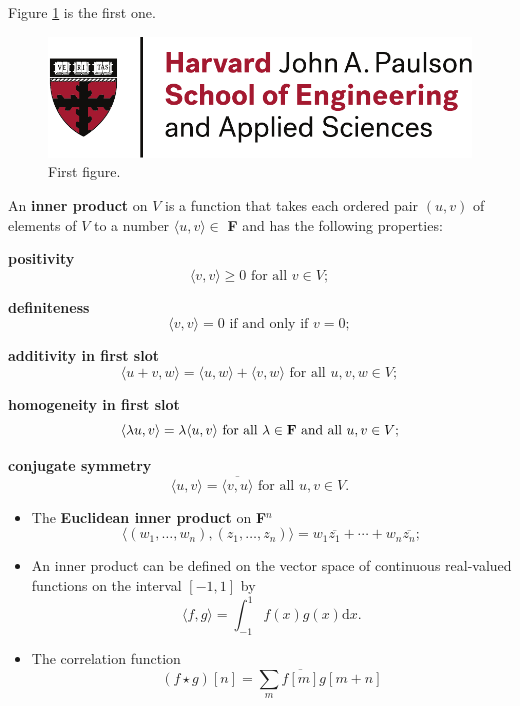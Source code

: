 \documentclass[abstract=true]{scrartcl}
\begin{document}
Figure \ref{fig:ref} is the first one.
\begin{figure}
    \centering
    \includegraphics[width = \textwidth]{logo.pdf}
    \caption{First figure.}
    \label{fig:ref}
\end{figure}
\newpage

\begin{definition}
An \textbf{inner product} on $V$ is a function that takes each ordered pair $(u,v)$ of 
elements of $V$ to a number $\langle u,v \rangle \in $ \textbf{F} and has the following properties:

\textbf{positivity}
$$
\langle v,v \rangle \geq 0 \text{ for all }v \in V;
$$

\textbf{definiteness}
$$
\langle v,v \rangle =0 \text{ if and only if }v=0;
$$

\textbf{additivity in first slot}
$$
\langle u+v,w \rangle = \langle u,w \rangle + \langle v,w \rangle \text{ for all }u,v,w\in V;
$$

\textbf{homogeneity in first slot}
$$
\langle \lambda u,v \rangle = \lambda \langle u,v \rangle \text{ for all }\lambda \in \text{\textbf{F} and all }u,v\in V; 
$$

\textbf{conjugate symmetry}
$$
\langle u,v \rangle = \overline{\langle v,u\rangle} \text{ for all }u,v\in V.
$$
\end{definition}
\newpage

\begin{itemize}
    \item The \textbf{Euclidean inner product} on \textbf{F}$^n$
    $$
    \langle (w_1,\ldots, w_n),(z_1,\ldots,z_n) \rangle= w_1\overline{z_1}+\cdots+w_n\overline{z_n};
    $$
    
    \item An inner product can be defined on the vector space of continuous
    real-valued functions on the interval $[-1,1]$ by
    $$
    \langle f,g\rangle = \int_{-1}^1f(x)g(x)\text{d}x.
    $$

    \item The correlation function
    $$
    (f\star g)[n] = \sum_{m}\overline{f[m]}g[m+n]
    $$
\end{itemize}
\newpage

\end{document}
